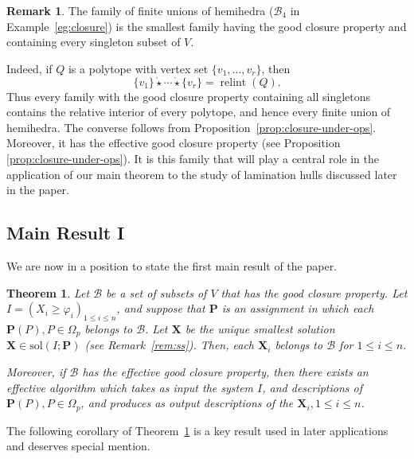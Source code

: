 \documentclass[10pt]{amsart}
\theoremstyle{plain}
\newtheorem{theorem}{Theorem}
\theoremstyle{definition}
\newtheorem{remark}[lemma]{Remark}
\providecommand{\bP}[0]{\ensuremath{\mathbf P}\xspace}
\providecommand{\bX}[0]{\ensuremath{\mathbf X}\xspace}
\let\leq\leqslant
\let\geq\geqslant
\providecommand{\sol}{\ensuremath{\mathrm{sol}}\xspace}
\let\phi\varphi
\begin{document}
\begin{remark}
\label{rem:hemihedra}
The family of finite unions of hemihedra 
($\mathcal{B}_4$ in Example~\ref{eg:closure})
is the smallest family having the good closure property and containing every singleton subset of $V$.

Indeed, if \(Q\) is a polytope with vertex set
\(\{v_1,\ldots,v_r\}\), then
\[
\{v_1\}\mathring\star\cdots\mathring\star\{v_r\}
=
\operatorname{relint}(Q).
\]
Thus every family with the good closure property containing all
singletons contains the relative interior of every polytope, and hence
every finite union of hemihedra. The converse follows from
Proposition~\ref{prop:closure-under-ops}.
Moreover, it has the effective good closure property (see Proposition~
\ref{prop:closure-under-ops}). It is this family that will play a central role in the application of our main theorem to the study of lamination hulls discussed later in the paper.
\end{remark}


\subsection{Main Result I}
\label{subsec:main1}
We are now in a position to state the first main result of the paper.




\begin{theorem}
\label{thm:hemihedra}
    Let $\mathcal{B}$ be a set of subsets of $V$ that has the good closure property. Let $I
    = (X_i \geq \phi_i)_{1 \leq i \leq n}$,
    and suppose that $\bP$ is an assignment in which each $\bP(P),P \in \Omega_p $ belongs to $\mathcal{B}$.
    Let $\bX$ be
    the unique smallest solution $\bX \in \sol(I;\bP)$
    (see Remark~\ref{rem:ss}). 
    Then, each $\bX_i$ belongs to $\mathcal{B}$ for $1 \leq i \leq n$.

    Moreover, if $\mathcal{B}$ has the effective good closure property, then
    there exists an effective algorithm which takes as input the system $I$, and descriptions 
    of $\bP(P), P \in \Omega_p$, and produces as output  
    descriptions of the $\bX_i, 1 \leq i \leq n$.
\end{theorem}

The following corollary of Theorem~\ref{thm:hemihedra} is a key result used in later applications
and deserves special mention.
\end{document}
